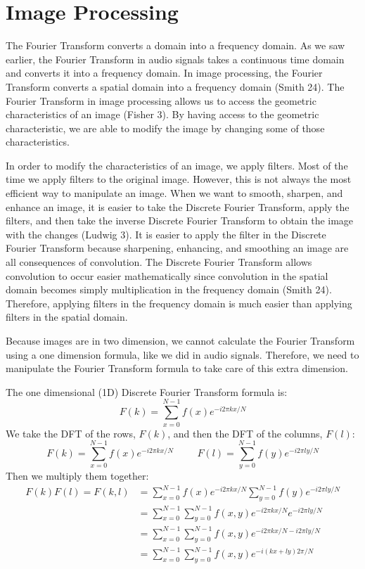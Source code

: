 \documentclass [../article.tex]{subfiles}
\begin{document}
  \section{Image Processing}
  The Fourier Transform converts a domain into a frequency domain.
  As we saw earlier, the Fourier Transform in audio signals takes
  a continuous time domain and converts it into a frequency domain.
  In image processing, the Fourier Transform converts a spatial
  domain into a frequency domain (Smith 24).  The Fourier Transform
  in image processing allows us to access the geometric
  characteristics of an image (Fisher 3).  By having access to the
  geometric characteristic, we are able to modify the image by
  changing some of those characteristics.

  In order to modify the characteristics of an image, we apply
  filters. Most of the time we apply filters to the original
  image. However, this is not always the most efficient way to
  manipulate an image. When we want to smooth, sharpen, and enhance
  an image, it is easier to take the Discrete Fourier Transform,
  apply the filters, and then take the inverse Discrete Fourier
  Transform to obtain the image with the changes (Ludwig 3).  It
  is easier to apply the filter in the Discrete Fourier Transform
  because sharpening, enhancing, and smoothing an image are all
  consequences of convolution.  The Discrete Fourier Transform
  allows convolution to occur easier mathematically since
  convolution in the spatial domain becomes simply multiplication
  in the frequency domain (Smith 24).  Therefore, applying filters
  in the frequency domain is much easier than applying filters in
  the spatial domain.

  Because images are in two dimension, we cannot calculate the
  Fourier Transform using a one dimension formula, like we did in
  audio signals.  Therefore, we need to manipulate the Fourier
  Transform formula to take care of this extra dimension.

  The one dimensional (1D) Discrete Fourier Transform formula is:
  \[ F(k) = \sum_{x=0}^{N-1}f(x)e^{-i2\pi kx/N} \]
  We take the DFT of the rows, $F(k)$, and then the DFT of the
  columns, $F(l)$:
  \[F(k) = \sum_{x=0}^{N-1}f(x)e^{-i2\pi kx/N}
    \phantom{space}
    F(l) = \sum_{y=0}^{N-1}f(y)e^{-i2\pi ly/N}\]
  Then we multiply them together:
  \begin{align*}
    F(k)F(l) = F(k,l) &=
    \sum_{x=0}^{N-1}f(x)e^{-i2\pi kx/N}
    \sum_{y=0}^{N-1}f(y)e^{-i2\pi ly/N}\\
    {} &= \sum_{x=0}^{N-1}\sum_{y=0}^{N-1}f(x,y)
    e^{-i2\pi kx/N}e^{-i2\pi ly/N}\\
    {} &= \sum_{x=0}^{N-1}\sum_{y=0}^{N-1}f(x,y)
    e^{-i2\pi kx/N - i2\pi ly/N}\\
    {} &= \sum_{x=0}^{N-1}\sum_{y=0}^{N-1}f(x,y)
    e^{-i(kx+ly)2\pi/N }
  \end{align*}
\end{document}
